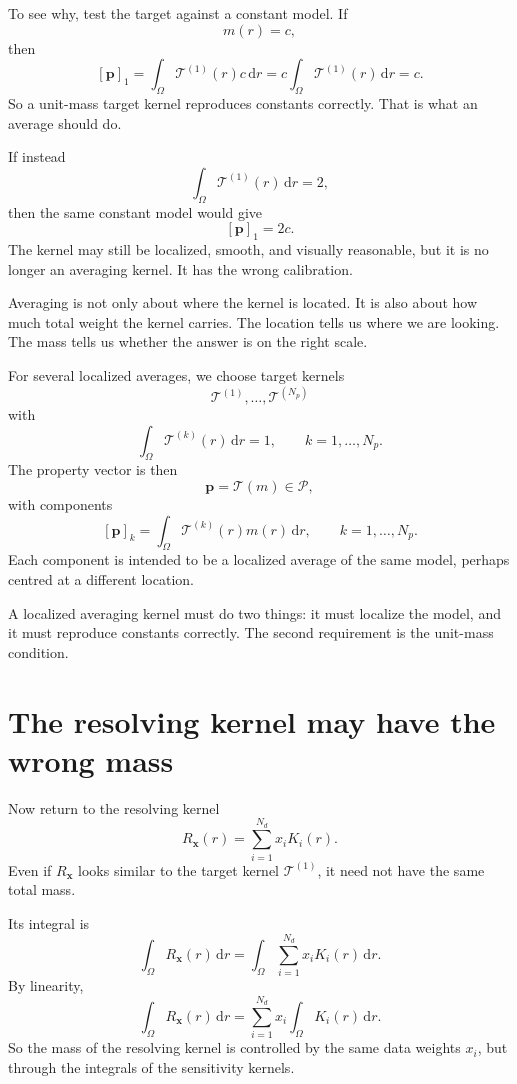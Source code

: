 \documentclass[11pt,openany]{book}
\theoremstyle{definition}
\theoremstyle{remark}
\newcommand{\Pspace}{\mathcal P}
\newcommand{\Tau}{\mathcal{T}}
\newcommand{\dd}{\,\mathrm d}
\begin{document}
To see why, test the target against a constant model. If
\[
  m(r)=c,
\]
then
\[
  [\mathbf p]_1
  =
  \int_\Omega \mathcal T^{(1)}(r)c\dd r
  =
  c\int_\Omega \mathcal T^{(1)}(r)\dd r
  =
  c.
\]
So a unit-mass target kernel reproduces constants correctly. That is what an average should do.

If instead
\[
  \int_\Omega \mathcal T^{(1)}(r)\dd r=2,
\]
then the same constant model would give
\[
  [\mathbf p]_1=2c.
\]
The kernel may still be localized, smooth, and visually reasonable, but it is no longer an
averaging kernel. It has the wrong calibration.

\begin{intuitionbox}
Averaging is not only about where the kernel is located. It is also about how much total weight
the kernel carries. The location tells us where we are looking. The mass tells us whether the
answer is on the right scale.
\end{intuitionbox}

For several localized averages, we choose target kernels
\[
  \mathcal T^{(1)},\dots,\mathcal T^{(N_p)}
\]
with
\[
  \int_\Omega \mathcal T^{(k)}(r)\dd r=1,
  \qquad k=1,\dots,N_p.
\]
The property vector is then
\[
  \mathbf p=\Tau(m)\in\Pspace,
\]
with components
\[
  [\mathbf p]_k
  =
  \int_\Omega \mathcal T^{(k)}(r)m(r)\dd r,
  \qquad k=1,\dots,N_p.
\]
Each component is intended to be a localized average of the same model, perhaps centred at a
different location.

\begin{lessonbox}
A localized averaging kernel must do two things: it must localize the model, and it must
reproduce constants correctly. The second requirement is the unit-mass condition.
\end{lessonbox}

\section{The resolving kernel may have the wrong mass}

Now return to the resolving kernel
\[
  R_{\mathbf x}(r)
  =
  \sum_{i=1}^{N_d}x_iK_i(r).
\]
Even if \(R_{\mathbf x}\) looks similar to the target kernel \(\mathcal T^{(1)}\), it need not have
the same total mass.

Its integral is
\[
  \int_\Omega R_{\mathbf x}(r)\dd r
  =
  \int_\Omega
  \sum_{i=1}^{N_d}x_iK_i(r)\dd r.
\]
By linearity,
\[
  \int_\Omega R_{\mathbf x}(r)\dd r
  =
  \sum_{i=1}^{N_d}
  x_i
  \int_\Omega K_i(r)\dd r.
\]
So the mass of the resolving kernel is controlled by the same data weights \(x_i\), but through
the integrals of the sensitivity kernels.
\end{document}
